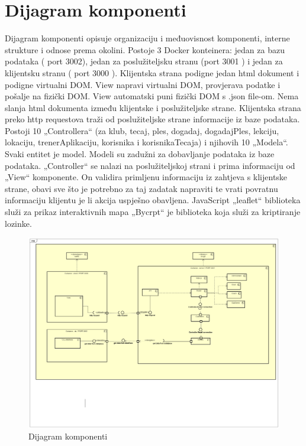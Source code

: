 		\section{Dijagram komponenti}
		
			\noindent Dijagram komponenti opisuje organizaciju i međuovisnost komponenti, interne strukture i odnose prema okolini. 
Postoje 3 Docker konteinera: jedan za bazu podataka ( port 3002), jedan za poslužiteljsku stranu (port 3001 ) i jedan za klijentsku stranu ( port 3000 ).
Klijentska strana podigne jedan html dokument i podigne virtualni DOM. View napravi virtualni DOM, provjerava podatke i pošalje na fizički DOM. View automatski puni fizički DOM s .json file-om. Nema slanja html dokumenta između klijentske i poslužiteljske strane. Klijentska strana preko http requestova traži od poslužiteljske strane informacije iz baze podataka. 
Postoji 10 „Controllera“ (za klub, tecaj, ples, dogadaj, dogadajPles, lekciju, lokaciju, trenerAplikaciju, korisnika i korisnikaTecaja) i njihovih 10 „Modela“.  Svaki entitet je model. Modeli su zadužni za dobavljanje podataka iz baze podataka. „Controller“  se nalazi na poslužiteljskoj strani i prima informaciju od „View“ komponente. On validira primljenu informaciju iz zahtjeva s klijentske strane, obavi sve što je potrebno za taj zadatak napraviti te vrati povratnu informaciju klijentu je li akcija uspješno obavljena. 
JavaScript „leaflet“ biblioteka služi za prikaz interaktivnih mapa
„Bycrpt“ je biblioteka koja služi za kriptiranje lozinke.

		
		\begin{figure}[H]
			\includegraphics[scale=0.3]{slike/DijagramKomponenti.PNG} %
			\centering
			\caption{Dijagram komponenti}
			\label{fig:stanje}
		\end{figure}
